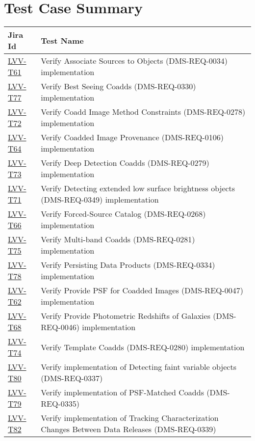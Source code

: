 \hypertarget{test-case-summary}{%
\section{Test Case Summary}\label{test-case-summary}}

\begin{longtable}[]{@{}ll@{}}
\toprule
Jira Id & Test Name\tabularnewline
\midrule
\endhead
\protect\hyperlink{lvv-t61---verify-associate-sources-to-objects--dms-req-0034-implementation}{LVV-T61}
& Verify Associate Sources to Objects (DMS-REQ-0034)
implementation\tabularnewline
\protect\hyperlink{lvv-t77---verify-best-seeing-coadds-dms-req-0330-implementation}{LVV-T77}
& Verify Best Seeing Coadds (DMS-REQ-0330) implementation\tabularnewline
\protect\hyperlink{lvv-t72---verify-coadd-image-method-constraints-dms-req-0278-implementation}{LVV-T72}
& Verify Coadd Image Method Constraints (DMS-REQ-0278)
implementation\tabularnewline
\protect\hyperlink{lvv-t64---verify-coadded-image-provenance-dms-req-0106-implementation}{LVV-T64}
& Verify Coadded Image Provenance (DMS-REQ-0106)
implementation\tabularnewline
\protect\hyperlink{lvv-t73---verify-deep-detection-coadds-dms-req-0279-implementation}{LVV-T73}
& Verify Deep Detection Coadds (DMS-REQ-0279)
implementation\tabularnewline
\protect\hyperlink{lvv-t71---verify-detecting-extended--low-surface-brightness-objects-dms-req-0349-implementation}{LVV-T71}
& Verify Detecting extended low surface brightness objects
(DMS-REQ-0349) implementation\tabularnewline
\protect\hyperlink{lvv-t66---verify-forced-source-catalog-dms-req-0268-implementation}{LVV-T66}
& Verify Forced-Source Catalog (DMS-REQ-0268)
implementation\tabularnewline
\protect\hyperlink{lvv-t75---verify-multi-band-coadds-dms-req-0281-implementation}{LVV-T75}
& Verify Multi-band Coadds (DMS-REQ-0281) implementation\tabularnewline
\protect\hyperlink{lvv-t78---verify-persisting-data-products-dms-req-0334-implementation}{LVV-T78}
& Verify Persisting Data Products (DMS-REQ-0334)
implementation\tabularnewline
\protect\hyperlink{lvv-t62---verify-provide-psf-for-coadded-images-dms-req-0047-implementation}{LVV-T62}
& Verify Provide PSF for Coadded Images (DMS-REQ-0047)
implementation\tabularnewline
\protect\hyperlink{lvv-t68---verify-provide-photometric-redshifts-of-galaxies-dms-req-0046-implementation}{LVV-T68}
& Verify Provide Photometric Redshifts of Galaxies (DMS-REQ-0046)
implementation\tabularnewline
\protect\hyperlink{lvv-t74---verify-template-coadds-dms-req-0280-implementation}{LVV-T74}
& Verify Template Coadds (DMS-REQ-0280) implementation\tabularnewline
\protect\hyperlink{lvv-t80---verify-implementation-of-detecting-faint-variable-objects-dms-req-0337}{LVV-T80}
& Verify implementation of Detecting faint variable objects
(DMS-REQ-0337)\tabularnewline
\protect\hyperlink{lvv-t79---verify-implementation-of-psf-matched-coadds-dms-req-0335}{LVV-T79}
& Verify implementation of PSF-Matched Coadds
(DMS-REQ-0335)\tabularnewline
\protect\hyperlink{lvv-t82---verify-implementation-of-tracking-characterization-changes-between-data-releases-dms-req-0339}{LVV-T82}
& Verify implementation of Tracking Characterization Changes Between
Data Releases (DMS-REQ-0339)\tabularnewline
\bottomrule
\end{longtable}


